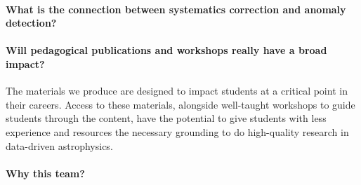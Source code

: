 \documentclass[12pt, fullpage, letterpaper]{article}
\begin{document}
\paragraph{What is the connection between systematics correction and anomaly detection?}

\paragraph{Will pedagogical publications and workshops really have a broad impact?}

The materials we produce are designed to impact students at a critical point in their careers. Access to these materials, alongside well-taught workshops to guide students through the content, have the potential to give students with less experience and resources the necessary grounding to do high-quality research in data-driven astrophysics.


\paragraph{Why this team?}

\clearpage


\end{document}
